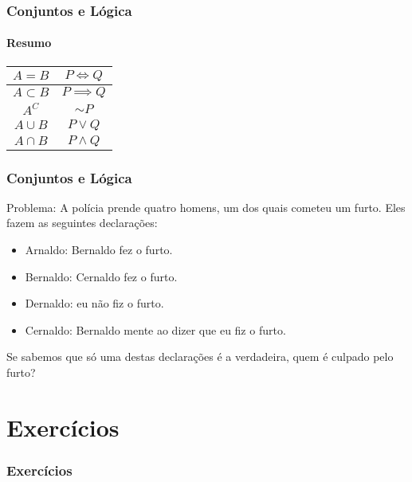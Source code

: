 \documentclass[brazil, notheorems, 10pt]{beamer}
\begin{document}
\begin{frame}
\frametitle{Conjuntos e Lógica} \framesubtitle{Resumo}
\begin{center}
\begin{tabular}{|c|c|}
  \hline
  $A=B$ & $P \iff Q$ \\ \hline
  $A \subset B$ & $P \implies Q$ \\ \hline
  $A^C$ & $\sim P$ \\ \hline
  $A \cup B$ & $P \lor Q$ \\ \hline
  $A \cap B$ & $P \land Q$ \\
  \hline
\end{tabular}
\end{center}
\end{frame}

\begin{frame}
\frametitle{Conjuntos e Lógica} %
Problema: A
polícia prende quatro homens, um dos quais cometeu um furto. Eles fazem
as seguintes declarações:
\begin{itemize}
  \item Arnaldo: Bernaldo fez o furto.
  \item Bernaldo: Cernaldo fez o furto.
  \item Dernaldo: eu não fiz o furto.
  \item Cernaldo: Bernaldo mente ao dizer que eu fiz o furto.
\end{itemize}
Se sabemos que só uma destas declarações é a verdadeira, quem é
culpado pelo furto?

\end{frame}

\section{Exercícios}

\begin{frame}
\frametitle{Exercícios}



\end{frame}
\end{document}
